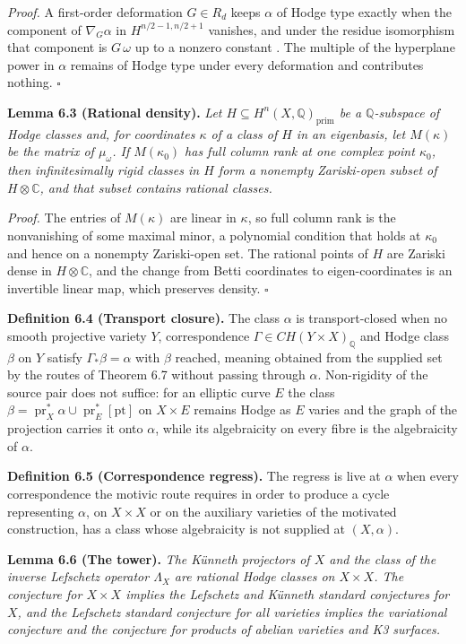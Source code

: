 \documentclass[10pt,twocolumn]{article}
\begin{document}
\emph{Proof.} A first-order deformation \(G\in R_d\) keeps \(\alpha\) of
Hodge type exactly when the component of \(\nabla_G\alpha\) in
\(H^{n/2-1,n/2+1}\) vanishes, and under the residue isomorphism that
component is \(G\,\omega\) up to a nonzero constant \cite{cg1980}. The
multiple of the hyperplane power in \(\alpha\) remains of Hodge type
under every deformation and contributes nothing. \(\square\)

\textbf{Lemma 6.3 (Rational density).} \emph{Let
\(H\subseteq H^n(X,\mathbb{Q})_{\mathrm{prim}}\) be a
\(\mathbb{Q}\)-subspace of Hodge classes and, for coordinates \(\kappa\)
of a class of \(H\) in an eigenbasis, let \(M(\kappa)\) be the matrix of
\(\mu_\omega\). If \(M(\kappa_0)\) has full column rank at one complex
point \(\kappa_0\), then infinitesimally rigid classes in \(H\) form a
nonempty Zariski-open subset of \(H\otimes\mathbb{C}\), and that subset
contains rational classes.}

\emph{Proof.} The entries of \(M(\kappa)\) are linear in \(\kappa\), so
full column rank is the nonvanishing of some maximal minor, a polynomial
condition that holds at \(\kappa_0\) and hence on a nonempty
Zariski-open set. The rational points of \(H\) are Zariski dense in
\(H\otimes\mathbb{C}\), and the change from Betti coordinates to
eigen-coordinates is an invertible linear map, which preserves density.
\(\square\)

\textbf{Definition 6.4 (Transport closure).} The class \(\alpha\) is
transport-closed when no smooth projective variety \(Y\), correspondence
\(\Gamma\in CH(Y\times X)_{\mathbb{Q}}\) and Hodge class \(\beta\) on
\(Y\) satisfy \(\Gamma_*\beta=\alpha\) with \(\beta\) reached, meaning
obtained from the supplied set by the routes of Theorem 6.7 without
passing through \(\alpha\). Non-rigidity of the source pair does not
suffice: for an elliptic curve \(E\) the class
\(\beta=\operatorname{pr}_X^*\alpha\cup\operatorname{pr}_E^*[\mathrm{pt}]\)
on \(X\times E\) remains Hodge as \(E\) varies and the graph of the
projection carries it onto \(\alpha\), while its algebraicity on every
fibre is the algebraicity of \(\alpha\).

\textbf{Definition 6.5 (Correspondence regress).} The regress is live at
\(\alpha\) when every correspondence the motivic route requires in order
to produce a cycle representing \(\alpha\), on \(X\times X\) or on the
auxiliary varieties of the motivated construction, has a class whose
algebraicity is not supplied at \((X,\alpha)\).

\textbf{Lemma 6.6 (The tower).} \emph{The Künneth projectors of \(X\)
and the class of the inverse Lefschetz operator \(\Lambda_X\) are
rational Hodge classes on \(X\times X\). The conjecture for
\(X\times X\) implies the Lefschetz and Künneth standard conjectures for
\(X\), and the Lefschetz standard conjecture for all varieties implies
the variational conjecture and the conjecture for products of abelian
varieties and K3 surfaces.}
\end{document}
